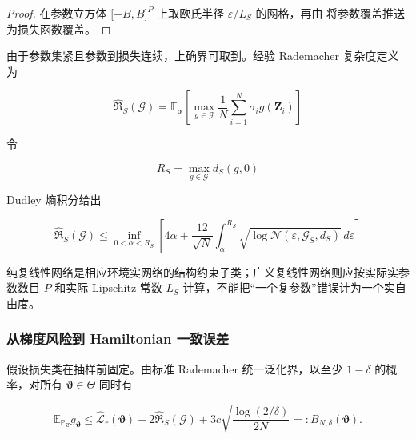 \begin{proof} 在参数立方体 \(\lbrack - B,B\rbrack^{P}\) 上取欧氏半径 \(\varepsilon/L_{S}\) 的网格，再由 将参数覆盖推送为损失函数覆盖。\end{proof}

由于参数集紧且参数到损失连续，上确界可取到。经验 Rademacher 复杂度定义为

\begin{equation}
\label{eq:chnn-4-43}
{\widehat{\mathfrak{R}}}_{S}\left( \mathcal{G} \right) = \mathbb{E}_{\bm{\sigma}}\left\lbrack \max_{g \in \mathcal{G}}\frac{1}{N}\sum_{i = 1}^{N}\sigma_{i}g\left( \mathbf{Z}_{i} \right) \right\rbrack
\end{equation}

令

\begin{equation}
\label{eq:chnn-4-44}
R_{S} = \max_{g \in \mathcal{G}}d_{S}(g,0)
\end{equation}

Dudley 熵积分给出\cite{Dudley1999UCLT}

\begin{equation}
\label{eq:chnn-4-45}
{\widehat{\mathfrak{R}}}_{S}\left( \mathcal{G} \right) \leq \inf_{0 < \alpha < R_{S}}\left\lbrack 4\alpha + \frac{12}{\sqrt{N}}\int_{\alpha}^{R_{S}}\sqrt{\log\mathcal{N}\left( \varepsilon,\mathcal{G}_{S},d_{S} \right)}\, d\varepsilon \right\rbrack
\end{equation}

纯复线性网络是相应环境实网络的结构约束子类；广义复线性网络则应按实际实参数数目 \(P\) 和实际 Lipschitz 常数 \(L_{S}\) 计算，不能把``一个复参数''错误计为一个实自由度。

\subsubsection{从梯度风险到 Hamiltonian 一致误差}\label{sec:chnn-4-6-4}

假设损失类在抽样前固定。由标准 Rademacher 统一泛化界，以至少 \(1 - \delta\) 的概率，对所有 \(\bm{\vartheta} \in \Theta\) 同时有

\begin{equation}
\label{eq:chnn-4-46}
\mathbb{E}_{\mathbb{P}_{Z}}g_{\bm{\vartheta}} \leq {\widehat{\mathcal{L}}}_{r}\left( \bm{\vartheta} \right) + 2{\widehat{\mathfrak{R}}}_{S}\left( \mathcal{G} \right) + 3c\sqrt{\frac{\log(2/\delta)}{2N}} = :B_{N,\delta}\left( \bm{\vartheta} \right).
\end{equation}

